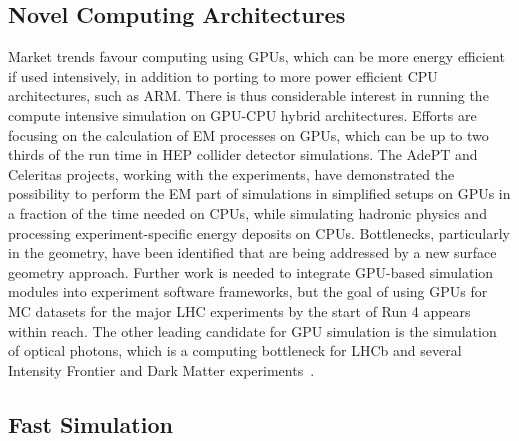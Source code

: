 \documentclass[10pt,a4paper]{article}
\begin{document}
\subsection{Novel Computing
Architectures}\label{novel-computing-architectures}

Market trends favour computing using GPUs, which can be more energy efficient if
used intensively, in addition to porting to more power efficient CPU
architectures, such as ARM. There is thus considerable interest in running the
compute intensive simulation on GPU-CPU hybrid architectures. Efforts are
focusing on the calculation of EM processes on GPUs, which can be up to two
thirds of the run time in HEP collider detector simulations. The AdePT
\cite{adept} and Celeritas\cite{osti_2361202} projects, working with the
experiments, have demonstrated the possibility to perform the EM part of
simulations in simplified setups on GPUs in a fraction of the time needed on
CPUs\cite{add CHEP refs for A and C}, while simulating hadronic physics and
processing experiment-specific energy deposits on CPUs. Bottlenecks,
particularly in the geometry, have been identified that are being addressed by a
new surface geometry approach. Further work is needed to integrate GPU-based
simulation modules into experiment software frameworks, but the goal of using
GPUs for MC datasets for the major LHC experiments by the start of Run 4 appears
within reach. The other leading candidate for GPU simulation is the simulation
of optical photons, which is a computing bottleneck for LHCb and several
Intensity Frontier and Dark Matter experiments~\cite{opticksCHEP}.

\subsection{Fast Simulation}\label{fast-simulation}
\end{document}
